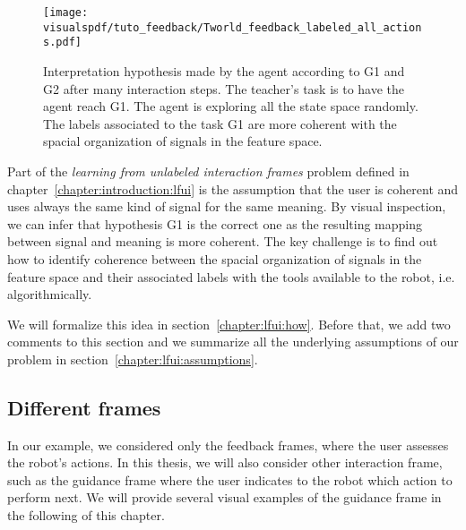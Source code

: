 
\begin{figure}[!htbp]
    \centering
    \texttt{[image: \\visualspdf/tuto\_feedback/Tworld\_feedback\_labeled\_all\_actions.pdf]}
    \caption{Interpretation hypothesis made by the agent according to G1 and G2 after many interaction steps. The teacher's task is to have the agent reach G1. The agent is exploring all the state space randomly. The labels associated to the task G1 are more coherent with the spacial organization of signals in the feature space.}
    \label{fig:TworldLabelinterpretation}
\end{figure}

Part of the \emph{learning from unlabeled interaction frames} problem defined in chapter~\ref{chapter:introduction:lfui} is the assumption that the user is coherent and uses always the same kind of signal for the same meaning. By visual inspection, we can infer that hypothesis G1 is the correct one as the resulting mapping between signal and meaning is more coherent. The key challenge is to find out how to identify coherence between the spacial organization of signals in the feature space and their associated labels with the tools available to the robot, i.e. algorithmically. 

We will formalize this idea in section~\ref{chapter:lfui:how}. Before that, we add two comments to this section and we summarize all the underlying assumptions of our problem in section~\ref{chapter:lfui:assumptions}.

\subsection{Different frames}

In our example, we considered only the feedback frames, where the user assesses the robot's actions. In this thesis, we will also consider other interaction frame, such as the guidance frame where the user indicates to the robot which action to perform next. We will provide several visual examples of the guidance frame in the following of this chapter.

